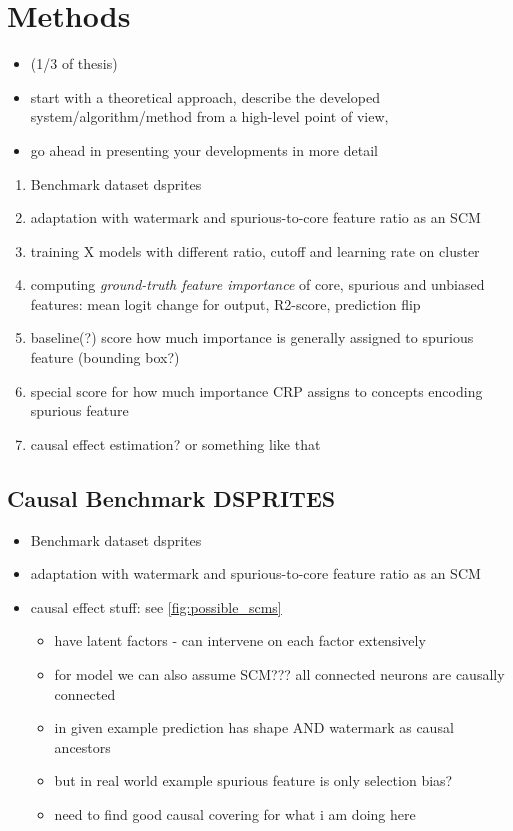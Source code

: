 \chapter{Methods}\label{chapter:method}

{ \color{red} 
\begin{itemize}
    \item (1/3 of thesis)
    \item start with a theoretical approach, describe the developed system/algorithm/method from a high-level point of view,
    \item go ahead in presenting your developments in more detail
\end{itemize}
 }


\begin{enumerate}
    \item Benchmark dataset dsprites
    \item adaptation with watermark and spurious-to-core feature ratio as an SCM
    \item training X models with different ratio, cutoff and learning rate on cluster
    \item computing \textit{ground-truth feature importance} of core, spurious and unbiased features: mean logit change for output, R2-score,  prediction flip 
    \item baseline(?) score how much importance is generally assigned to spurious feature (bounding box?)
    \item special score for how much importance CRP assigns to concepts encoding spurious feature
    \item causal effect estimation? or something like that
\end{enumerate}




\section{Causal Benchmark DSPRITES}
\begin{itemize}
    \item Benchmark dataset dsprites
    \item adaptation with watermark and spurious-to-core feature ratio as an SCM
    \item causal effect stuff: see \cref{fig:possible_scms}
    \begin{itemize}
        \item have latent factors - can intervene on each factor extensively
        \item for model we can also assume SCM??? all connected neurons are causally connected
        \item in given example prediction has shape AND watermark as causal ancestors
        \item but in real world example spurious feature is only selection bias?
        \item need to find good causal covering for what i am doing here
    \end{itemize}
\end{itemize}

